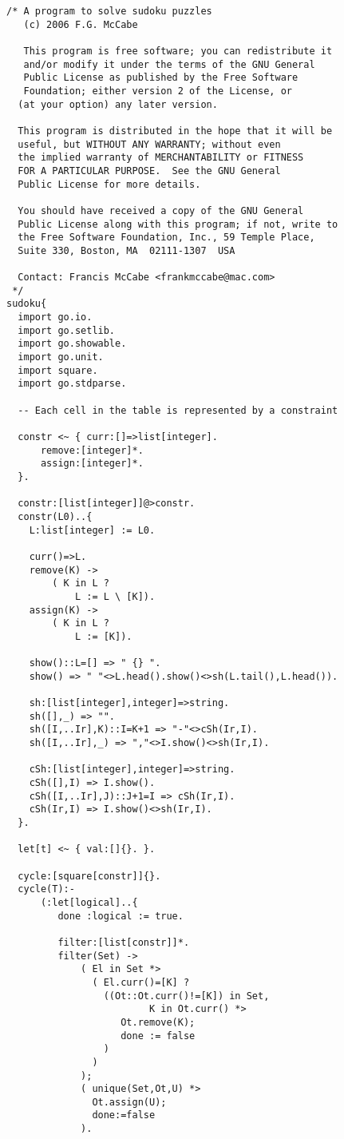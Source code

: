\begin{verbatim}
/* A program to solve sudoku puzzles
   (c) 2006 F.G. McCabe
 
   This program is free software; you can redistribute it 
   and/or modify it under the terms of the GNU General 
   Public License as published by the Free Software 
   Foundation; either version 2 of the License, or
  (at your option) any later version.

  This program is distributed in the hope that it will be 
  useful, but WITHOUT ANY WARRANTY; without even 
  the implied warranty of MERCHANTABILITY or FITNESS 
  FOR A PARTICULAR PURPOSE.  See the GNU General 
  Public License for more details.

  You should have received a copy of the GNU General 
  Public License along with this program; if not, write to 
  the Free Software Foundation, Inc., 59 Temple Place, 
  Suite 330, Boston, MA  02111-1307  USA

  Contact: Francis McCabe <frankmccabe@mac.com>
 */
sudoku{
  import go.io.
  import go.setlib.
  import go.showable.
  import go.unit.
  import square.
  import go.stdparse.

  -- Each cell in the table is represented by a constraint
  
  constr <~ { curr:[]=>list[integer]. 
      remove:[integer]*. 
      assign:[integer]*. 
  }.
  
  constr:[list[integer]]@>constr.
  constr(L0)..{
    L:list[integer] := L0.

    curr()=>L.
    remove(K) ->
        ( K in L ? 
            L := L \ [K]).
    assign(K) ->
        ( K in L ? 
            L := [K]).

    show()::L=[] => " {} ".
    show() => " "<>L.head().show()<>sh(L.tail(),L.head()).

    sh:[list[integer],integer]=>string.
    sh([],_) => "".
    sh([I,..Ir],K)::I=K+1 => "-"<>cSh(Ir,I).
    sh([I,..Ir],_) => ","<>I.show()<>sh(Ir,I).
    
    cSh:[list[integer],integer]=>string.
    cSh([],I) => I.show().
    cSh([I,..Ir],J)::J+1=I => cSh(Ir,I).
    cSh(Ir,I) => I.show()<>sh(Ir,I).
  }.

  let[t] <~ { val:[]{}. }.

  cycle:[square[constr]]{}.
  cycle(T):-
      (:let[logical]..{
         done :logical := true.

         filter:[list[constr]]*.
         filter(Set) ->
             ( El in Set *>
               ( El.curr()=[K] ?
                 ((Ot::Ot.curr()!=[K]) in Set, 
                         K in Ot.curr() *>
                    Ot.remove(K);
                    done := false
                 )
               )
             );
             ( unique(Set,Ot,U) *>
               Ot.assign(U);
               done:=false
             ).


\end{verbatim}
